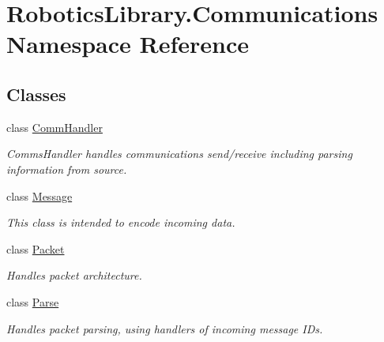 \hypertarget{namespace_robotics_library_1_1_communications}{}\section{Robotics\+Library.\+Communications Namespace Reference}
\label{namespace_robotics_library_1_1_communications}
\subsection*{Classes}
\begin{DoxyCompactItemize}
\item 
class \hyperlink{class_robotics_library_1_1_communications_1_1_comm_handler}{Comm\+Handler}
\begin{DoxyCompactList}\small\item\em Comms\+Handler handles communications send/receive including parsing information from source. \end{DoxyCompactList}\item 
class \hyperlink{class_robotics_library_1_1_communications_1_1_message}{Message}
\begin{DoxyCompactList}\small\item\em This class is intended to encode incoming data. \end{DoxyCompactList}\item 
class \hyperlink{class_robotics_library_1_1_communications_1_1_packet}{Packet}
\begin{DoxyCompactList}\small\item\em Handles packet architecture. \end{DoxyCompactList}\item 
class \hyperlink{class_robotics_library_1_1_communications_1_1_parse}{Parse}
\begin{DoxyCompactList}\small\item\em Handles packet parsing, using handlers of incoming message I\+Ds. \end{DoxyCompactList}\end{DoxyCompactItemize}

